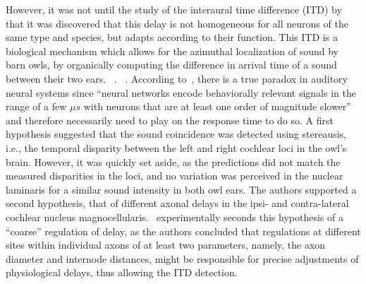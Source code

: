 \documentclass[brainsci, %
               review,accept,pdftex,moreauthors
               ]{Definitions/mdpi}
\begin{document}
However, it was not until the study of the interaural time difference (ITD) by ~\citet{carr_circuit_1990} that it was discovered that this delay is not homogeneous for all neurons of the same type and species, but adapts according to their function. This ITD is a biological mechanism which allows for the azimuthal localization of sound by barn owls, by organically computing the difference in arrival time of a sound between their two ears. ~\citep{jeffress_place_1948}. ~\citep{konishi_coding_2003}. According to~\citep{gerstner_neuronal_1996}, there is a true paradox in auditory neural systems since ``neural networks encode behaviorally relevant signals in the range of a few $\mu s$ with neurons that are at least one order of magnitude slower'' and therefore necessarily need to play on the response time to do so.   A first hypothesis suggested that the sound coincidence was detected using stereausis, i.e., the temporal disparity between the left and right cochlear loci in the owl's brain. However, it was quickly set aside, as the predictions did not match the measured disparities in the loci, and no variation was perceived in the nuclear laminaris for a similar sound intensity in both owl ears. The authors supported a second hypothesis, that of different axonal delays in the ipsi- and contra-lateral cochlear nucleus magnocellularis.~\citet{seidl_mechanisms_2010} experimentally seconds this hypothesis of a ``coarse'' regulation of delay, as the authors concluded that regulations at different sites within individual axons of at least two parameters, namely, the axon diameter and internode distances, might be responsible for precise adjustments of physiological delays, thus allowing the ITD detection. 
\end{document}
